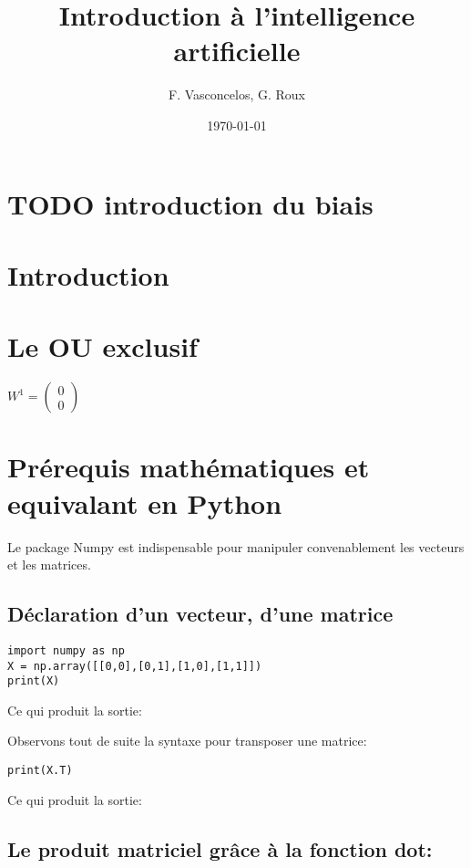 \documentclass[11pt]{article}
\author{F. Vasconcelos, G. Roux}
\date{\today}
\title{Introduction à l'intelligence artificielle}
\begin{document}
\maketitle
\tableofcontents



\section{{\bfseries\sffamily TODO} introduction du biais}
\label{sec-1}


\section{Introduction}
\label{sec-2}

\section{Le OU exclusif}
\label{sec-3}

$W^{1}=\begin{pmatrix}0\\0\end{pmatrix}$

\section{Prérequis mathématiques et equivalant en Python}
\label{sec-4}

Le package Numpy est indispensable pour manipuler convenablement les vecteurs
et les matrices.

\subsection{Déclaration d'un vecteur, d'une matrice}
\label{sec-4-1}

\begin{verbatim}
import numpy as np
X = np.array([[0,0],[0,1],[1,0],[1,1]])
print(X)
\end{verbatim}

Ce qui produit la sortie:

Observons tout de suite la syntaxe pour transposer une matrice:

\begin{verbatim}
print(X.T)
\end{verbatim}

Ce qui produit la sortie:

\subsection{Le produit matriciel grâce à la fonction dot:}
\label{sec-4-2}
\end{document}
